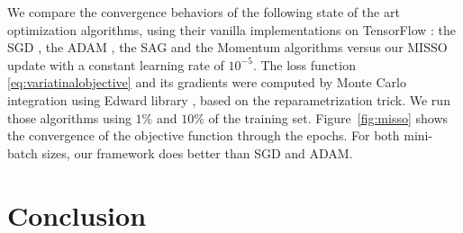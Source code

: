 \documentclass[11pt]{article}
\theoremstyle{t}
\begin{document}
We compare the convergence behaviors of the following state of the art optimization algorithms, using their vanilla implementations on TensorFlow \citep{tensorflow2015-whitepaper}: the SGD \citep{kiefer1952}, the ADAM \citep{kingma:adam}, the SAG \citep{roux} and the Momentum \citep{sutskever} algorithms versus our MISSO update with a constant learning rate of $10^{-5}$. The loss function \eqref{eq:variatinalobjective} and its gradients were computed by Monte Carlo integration using Edward library \citep{tran2016edward}, based on the reparametrization trick.  We run those algorithms using $1\%$ and $10\%$ of the training set.
Figure~\ref{fig:misso} shows the convergence of the objective function through the epochs. 
For both mini-batch sizes, our framework does better than SGD and ADAM. 



\section{Conclusion}

\newpage

\newpage

\appendix
\end{document}

